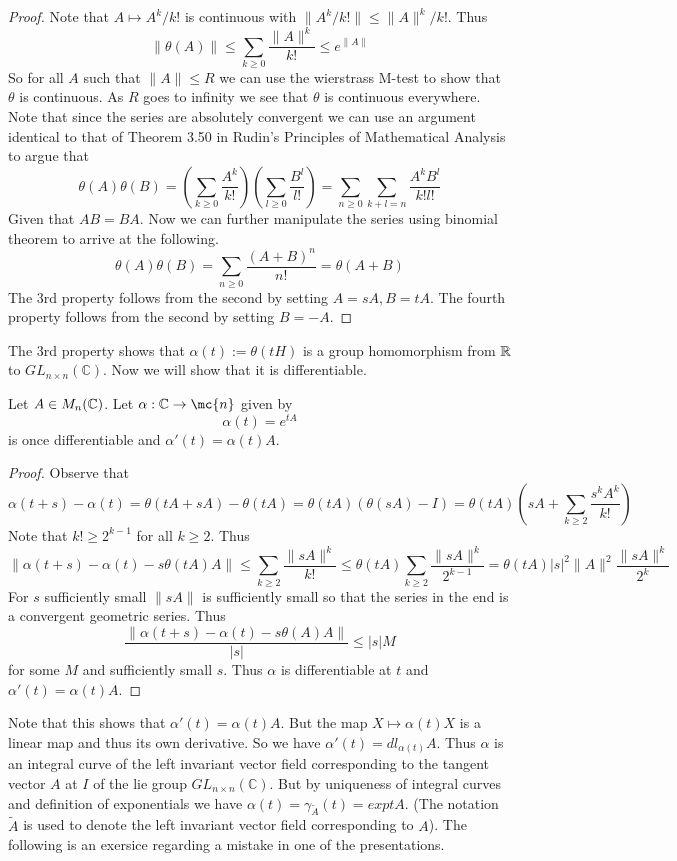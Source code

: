 \documentclass{article}
\newcommand*{\glcg}[1]{GL_{#1 \times #1}(\mathbb{C})}
\begin{document}
\begin{proof}
    Note that $A\mapsto A^k/k!$ is continuous with $\|A^k/k!\|\leq \|A\|^k/k!$. Thus $$\|\theta(A)\|\leq \sum_{k\geq 0}\frac{\|A\|^k}{k!}\leq e^{\|A\|}$$
    So for all $A$ such that $\|A\|\leq R$ we can use the wierstrass M-test to show that $\theta$ is continuous. As $R$ goes to infinity we see that $\theta$ is continuous everywhere.
    Note that since the series are absolutely convergent we can use an argument identical to that of Theorem 3.50 in Rudin's Principles of Mathematical Analysis to argue that $$\theta(A)\theta(B) = \left( \sum_{k\geq 0} \frac{A^k}{k!} \right)\left( \sum_{l\geq 0} \frac{B^l}{l!} \right) = \sum_{n\geq 0}\sum_{k+l=n}\frac{A^kB^l}{k!l!}$$
    Given that $AB=BA$. Now we can further manipulate the series using binomial theorem to arrive at the following.
    $$\theta(A)\theta(B) = \sum_{n\geq 0}\frac{(A+B)^n}{n!} = \theta(A+B)$$
    The 3rd property follows from the second by setting $A = sA,B = tA$. The fourth property follows from the second by setting $B = -A$.
\end{proof}

The 3rd property shows that $\alpha(t):=\theta(tH)$ is a group homomorphism from $\mathbb R$ to $\glcg{n}$. Now we will show that it is differentiable.

\begin{proposition}
    Let $A\in M_n(\mathbb C)$. Let $\alpha:\mathbb{C}\to \mc{n}$ given by $$\alpha(t) = e^{tA}$$
    is once differentiable and $\alpha'(t) = \alpha(t)A$.
\end{proposition}
\begin{proof}
    Observe that $$\alpha(t+s)-\alpha(t) = \theta(tA+sA)-\theta(tA) = \theta(tA)(\theta(sA)-I) = \theta(tA)\left( sA + \sum_{k\geq 2}\frac{s^kA^k}{k!} \right)$$
    Note that $k!\geq 2^{k-1}$ for all $k\geq 2$. Thus $$\|\alpha(t+s)-\alpha(t) - s\theta(tA)A \|\leq \sum_{k\geq 2}\frac{\|sA\|^k}{k!}\leq \theta(tA)\sum_{k\geq 2}\frac{\|sA\|^k}{2^{k-1}} = \theta(tA)|s|^2\|A\|^2\frac{\|sA\|^k}{2^k}$$
    For $s$ sufficiently small $\|sA\|$ is sufficiently small so that the series in the end is a convergent geometric series. Thus $$\frac{\|\alpha(t+s)-\alpha(t) - s\theta(A)A \|}{|s|}\leq |s|M$$
    for some $M$ and sufficiently small $s$. Thus $\alpha$ is differentiable at $t$ and $\alpha'(t) = \alpha(t)A$.
\end{proof}

Note that this shows that $\alpha'(t) = \alpha(t)A$. But the map $X\mapsto \alpha(t)X$ is a linear map and thus its own derivative. So we have $\alpha'(t) = dl_{\alpha(t)}A$. Thus $\alpha$ is an integral curve of 
the left invariant vector field corresponding to the tangent vector $A$ at $I$ of the lie group $\glcg{n}$. But by uniqueness of integral curves and definition of exponentials we have $\alpha(t) = \gamma_{\tilde{A}}(t) =exp{tA}$.
(The notation $\tilde{A}$ is used to denote the left invariant vector field corresponding to $A$).
The following is an exersice regarding a mistake in one of the presentations.
\end{document}
